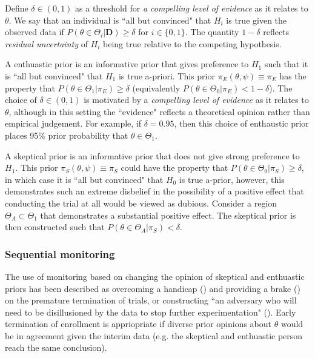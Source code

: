 \documentclass[12pt]{article}
\begin{document}
Define $\delta\in(0,1)$ as a threshold for \textit{a compelling level of evidence} as it relates to $\theta$. We say that an individual is ``all but convinced" that $H_i$ is true given the observed data if $P(\theta\in\Theta_i|\mathbf{D})\geq\delta$ for $i\in\{0,1\}$. The quantity $1-\delta$ reflects \textit{residual uncertainty} of $H_i$ being true relative to the competing hypothesis. %


A enthuastic prior is an informative prior that gives preference to $H_1$ such that it is ``all but convinced" that $H_1$ is true a-priori. This prior $\pi_{E}(\theta,\psi)\equiv\pi_{E}$ has the property that $P(\theta\in\Theta_1| \pi_{E})\geq\delta$ (equivalently $P(\theta\in\Theta_0| \pi_{E})<1-\delta$). The choice of $\delta\in(0,1)$ is motivated by a \textit{compelling level of evidence} as it relates to $\theta$, although in this setting the ``evidence" reflects a theoretical opinion rather than empirical judgement. For example, if $\delta=0.95$, then this choice of enthaustic prior places 95\% prior probability that $\theta\in\Theta_1$.  

A skeptical prior is an informative prior that does not give strong preference to $H_1$. This prior $\pi_{S}(\theta,\psi)\equiv\pi_{S}$ could have the property that $P(\theta\in\Theta_0| \pi_{S})\geq\delta$, in which case it is ``all but convinced" that $H_0$ is true a-prior, however, this demonstrates such an extreme disbelief in the possibility of a positive effect that conducting the trial at all would be viewed as dubious. Consider a region $\Theta_A\subset\Theta_1$ that demonstrates a substantial positive effect. The skeptical prior is then constructed such that $P(\theta\in\Theta_A| \pi_{S})<\delta$.

\subsubsection{Sequential monitoring}
The use of monitoring based on changing the opinion of skeptical and enthuastic priors has been described as overcoming a handicap (\cite{Freedman1989}) and providing a brake (\cite{Fayers1997}) on the premature termination of trials, or constructing ``an adversary who will need to be disillusioned by the data to stop further experimentation" (\cite{Spiegelhalter1994}). Early termination of enrollment is appriopriate if diverse prior opinions about $\theta$ would be in agreement given the interim data (e.g. the skeptical and enthuastic person reach the same conclusion). 
\end{document}
